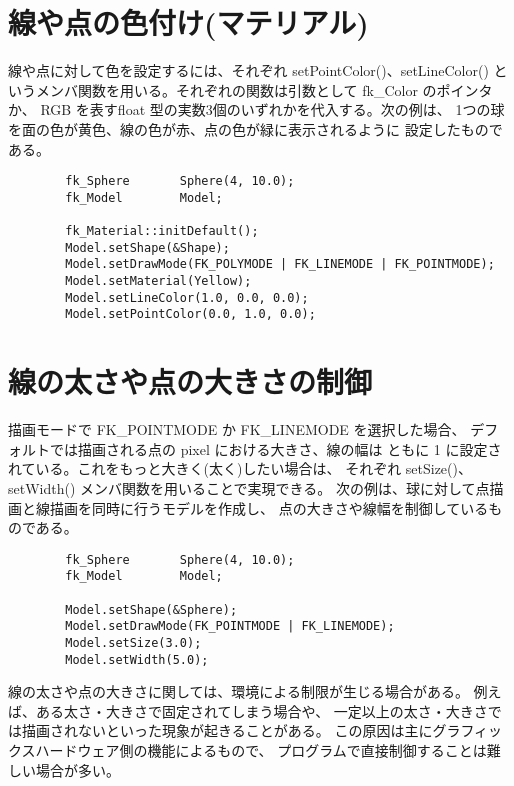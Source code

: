 \section{線や点の色付け(マテリアル)} \label{sec:pointlinemat}
線や点に対して色を設定するには、それぞれ setPointColor()、setLineColor()
というメンバ関数を用いる。それぞれの関数は引数として fk\_Color のポインタか、
RGB を表すfloat 型の実数3個のいずれかを代入する。次の例は、
1つの球を面の色が黄色、線の色が赤、点の色が緑に表示されるように
設定したものである。
\\
\begin{breakbox}
\begin{verbatim}
        fk_Sphere       Sphere(4, 10.0);
        fk_Model        Model;

        fk_Material::initDefault();
        Model.setShape(&Shape);
        Model.setDrawMode(FK_POLYMODE | FK_LINEMODE | FK_POINTMODE);
        Model.setMaterial(Yellow);     
        Model.setLineColor(1.0, 0.0, 0.0);
        Model.setPointColor(0.0, 1.0, 0.0);
\end{verbatim}
\end{breakbox}

\section{線の太さや点の大きさの制御} \label{sec:widthsize}
描画モードで FK\_POINTMODE か FK\_LINEMODE を選択した場合、
デフォルトでは描画される点の pixel における大きさ、線の幅は
ともに 1 に設定されている。これをもっと大きく(太く)したい場合は、
それぞれ setSize()、setWidth() メンバ関数を用いることで実現できる。
次の例は、球に対して点描画と線描画を同時に行うモデルを作成し、
点の大きさや線幅を制御しているものである。
\\
\begin{breakbox}
\begin{verbatim}
        fk_Sphere       Sphere(4, 10.0);
        fk_Model        Model;

        Model.setShape(&Sphere);
        Model.setDrawMode(FK_POINTMODE | FK_LINEMODE);
        Model.setSize(3.0);
        Model.setWidth(5.0);
\end{verbatim}
\end{breakbox}

線の太さや点の大きさに関しては、環境による制限が生じる場合がある。
例えば、ある太さ・大きさで固定されてしまう場合や、
一定以上の太さ・大きさでは描画されないといった現象が起きることがある。
この原因は主にグラフィックスハードウェア側の機能によるもので、
プログラムで直接制御することは難しい場合が多い。


